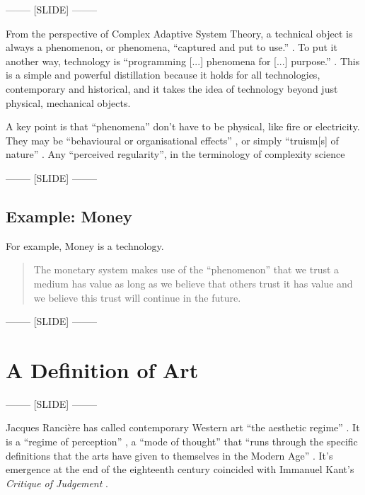 \documentclass[letter:wpaper]{article}
\begin{document}
-------- [SLIDE] --------

    From the perspective of Complex Adaptive System Theory, a technical object is always a phenomenon, or phenomena, ``captured and put to use.'' \citep[p.53]{theNatureOfTechnology2009}. To put it another way, technology is ``programming [...] phenomena for [...] purpose.'' \citep[p.53]{theNatureOfTechnology2009}. This is a simple and powerful distillation because it holds for all technologies, contemporary and historical, and it takes the idea of technology beyond just physical, mechanical objects.
    
    A key point is that ``phenomena'' don't have to be physical, like fire or electricity. They may be ``behavioural or organisational effects'' \citep[p.55]{theNatureOfTechnology2009}, or simply ``truism[s] of nature'' \citep[p.45]{theNatureOfTechnology2009}. Any ``perceived regularity'', in the terminology of complexity science \citep[p.2]{FlackCrsGrnngAsDwnwrdCstn2021}

-------- [SLIDE] --------

    \subsection{Example: Money}

    For example, Money is a technology.

    \begin{quote}
        The monetary system makes use of the ``phenomenon'' that we trust a medium has value as long as we believe that others trust it has value and we believe this trust will continue in the future. \citep[p.55]{theNatureOfTechnology2009}
    \end{quote}

-------- [SLIDE] --------

\section{A Definition of Art}

-------- [SLIDE] --------

    Jacques Rancière has called contemporary Western art ``the aesthetic regime'' \citep[p.23]{RancierPltcsOfThAsthtcs2004}. It is a ``regime of perception'' \citep[p.xii]{RancièreAisthesis2013}, a ``mode of thought'' that ``runs through the specific definitions that the arts have given to themselves in the Modern Age'' \citep[p.23]{RancierPltcsOfThAsthtcs2004}. It's emergence at the end of the eighteenth century coincided with Immanuel Kant's \emph{Critique of Judgement} \citep[pp.23–24]{RancierPltcsOfThAsthtcs2004}. 
\end{document}
